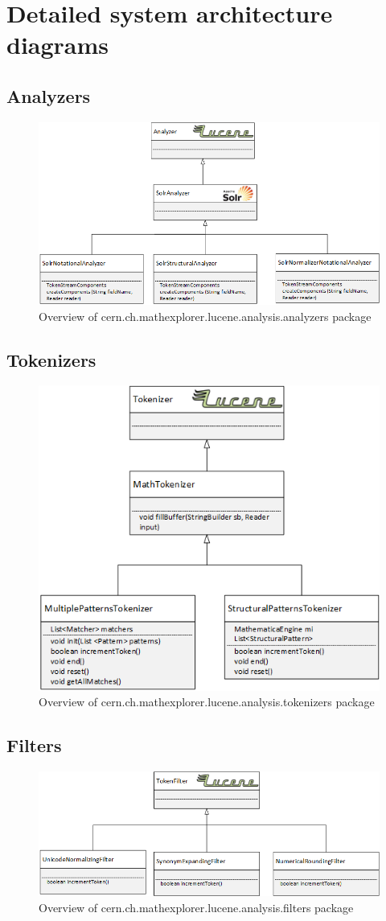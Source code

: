 \chapter{Detailed system architecture diagrams}

\section{Analyzers}
\begin{figure}
	\centering
	\includegraphics[height=4 cm]{visio_drawings/analyzers.png}
	\caption{Overview of {\small{\codefont cern.ch.mathexplorer.lucene.analysis.analyzers}} package}
	\label{uml_analyzers}
\end{figure}

\section{Tokenizers}
\begin{figure}
	\centering
	\includegraphics[height=4 cm]{visio_drawings/tokenizers.png}
	\caption{Overview of {\small{\codefont cern.ch.mathexplorer.lucene.analysis.tokenizers}} package}
	\label{uml_tokenizers}
\end{figure}

\section{Filters}
\begin{figure}
	\centering
	\includegraphics[height=4 cm]{visio_drawings/filters.png}
	\caption{Overview of {\small{\codefont cern.ch.mathexplorer.lucene.analysis.filters}} package}
	\label{uml_filters}
\end{figure}